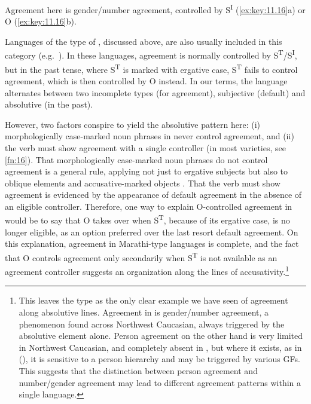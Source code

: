 \documentclass[output=paper]{langsci/langscibook}
\begin{document}
Agreement here is gender/number agreement, controlled by S\textsuperscript{I}
(\ref{ex:key:11.16}a) or O (\ref{ex:key:11.16}b).

Languages of the type of , discussed above, are also usually included in
this category (e.g.\ \citealt[305]{Bobaljik2008}). In these languages,
agreement is normally controlled by S\textsuperscript{T}/S\textsuperscript{I},
but in the past tense, where S\textsuperscript{T} is marked with ergative case,
S\textsuperscript{T} fails to control agreement, which is then controlled by O
instead. In our terms, the language alternates between two incomplete types
(for agreement), subjective (default) and absolutive (in the past).

However, two factors conspire to yield the absolutive pattern here: (i)
morphologically case-marked noun phrases in  never control agreement,
and (ii) the verb must show agreement with a single controller (in most
varieties, see \cref{fn:16}). That morphologically case-marked noun phrases do not
control agreement is a general rule, applying not just to ergative subjects but
also to oblique elements and accusative-marked objects
\citep[446]{Pandharipande1997}. That the verb must show agreement is evidenced
by the appearance of default agreement in the absence of an eligible
controller. Therefore, one way to explain O-controlled agreement in 
would be to say that O takes over when S\textsuperscript{T}, because of its
ergative case, is no longer eligible, as an option preferred over the last
resort default agreement. On this explanation, agreement in Marathi-type
languages is complete, and the fact that O controls agreement only secondarily
when S\textsuperscript{T} is not available as an agreement controller suggests
an organization along the lines of accusativity.\footnote{This leaves the
     type as the only clear example we have seen of agreement along
    absolutive lines. Agreement in  is gender/number agreement, a
    phenomenon found across Northwest Caucasian, always triggered by the
    absolutive element alone. Person agreement on the other hand is very
    limited in Northwest Caucasian, and completely absent in , but where it
    exists, as in  (\citealt{VandenBerg1995}), it is sensitive to a
    person hierarchy and may be triggered by various \glspl{GF}. This suggests that the distinction between person agreement and
    number/gender agreement may lead to different agreement  patterns
within a single language.\label{fn:21}}
\end{document}
